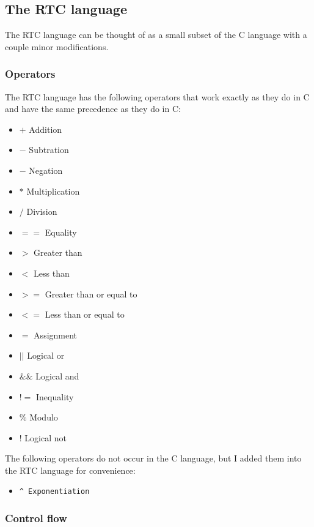 
\subsection{The RTC language}

The RTC language can be thought of as a small subset of the
C language with a couple minor modifications.

\subsubsection{Operators}

The RTC language has the following operators that work exactly as they do in C
and have the same precedence as they do in C:
\begin{itemize}
  \item $+$  Addition
  \item $-$  Subtration
  \item $-$  Negation
  \item $*$  Multiplication
  \item $/$  Division
  \item $==$ Equality
  \item $>$  Greater than
  \item $<$  Less than
  \item $>=$ Greater than or equal to
  \item $<=$ Less than or equal to
  \item $=$  Assignment
  \item $||$ Logical or
  \item $\&\&$ Logical and
  \item $!=$ Inequality
  \item $\%$ Modulo
  \item $!$  Logical not
\end{itemize}

\noindent The following operators do not occur in the C language, but
I added them into the RTC language for convenience:

\begin{itemize}
  \item \begin{verbatim}^ Exponentiation \end{verbatim}
\end{itemize}


\subsubsection{Control flow}

